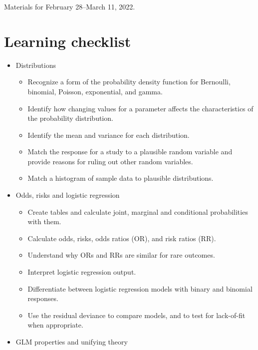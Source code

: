\documentclass[
  openany]{book}
\newenvironment{yellowbox}{
  \definecolor{shadecolor}{rgb}{254,187,67}  %
  \color{black}
  \begin{shaded}}
 {\end{shaded}}
\begin{document}
\begin{yellowbox}
Materials for February 28--March 11, 2022.

\end{yellowbox}

\hypertarget{learning-checklist-3}{%
\section{Learning checklist}\label{learning-checklist-3}}

\begin{itemize}
\item
  Distributions

  \begin{itemize}
  \item
    Recognize a form of the probability density function for
    Bernoulli, binomial, Poisson, exponential, and gamma.
  \item
    Identify how changing values for a parameter affects the
    characteristics of the probability distribution.
  \item
    Identify the mean and variance for each distribution.
  \item
    Match the response for a study to a plausible random variable
    and provide reasons for ruling out other random variables.
  \item
    Match a histogram of sample data to plausible distributions.
  \end{itemize}
\item
  Odds, risks and logistic regression

  \begin{itemize}
  \item
    Create tables and calculate joint, marginal and conditional
    probabilities with them.
  \item
    Calculate odds, risks, odds ratios (OR), and risk ratios (RR).
  \item
    Understand why ORs and RRs are similar for rare outcomes.
  \item
    Interpret logistic regression output.
  \item
    Differentiate between logistic regression models with binary and
    binomial responses.
  \item
    Use the residual deviance to compare models, and to test for
    lack-of-fit when appropriate.
  \end{itemize}
\item
  GLM properties and unifying theory


\end{itemize}
\end{document}
